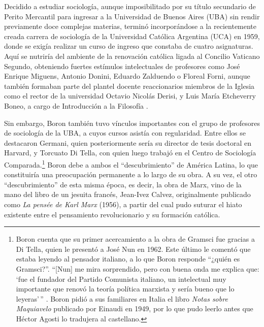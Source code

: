 Decidido a estudiar sociología, aunque imposibilitado por su título secundario de Perito Mercantil para ingresar a la Universidad de Buenos Aires (UBA) sin rendir previamente doce complejas materias, terminó incorporándose a la recientemente creada carrera de sociología de la Universidad Católica Argentina (UCA) en 1959, donde se exigía realizar un curso de ingreso que constaba de cuatro asignaturas. Aquí se nutriría del ambiente de la renovación católica ligada al Concilio Vaticano Segundo, obteniendo fuertes estímulos intelectuales de profesores como José Enrique Miguens, Antonio Donini, Eduardo Zalduendo o Floreal Forni, aunque también formaban parte del plantel docente reaccionarios miembros de la Iglesia como el rector de la universidad Octavio Nicolás Derisi, y Luis María Etcheverry Boneo, a cargo de Introducción a la Filosofía \parencite{281-ZANCA2006}.

Sin embargo, Boron también tuvo vínculos importantes con el grupo de profesores de sociología de la UBA, a cuyos cursos asistía con regularidad. Entre ellos se destacaron Germani, quien posteriormente sería su director de tesis doctoral en Harvard, y Torcuato Di Tella, con quien luego trabajó en el Centro de Sociología Comparada.\footnote{Boron cuenta que su primer acercamiento a la obra de Gramsci fue gracias a Di Tella, quien le presentó a José Nun en 1962. Este último le comentó que estaba leyendo al pensador italiano, a lo que Boron responde ``¿quién es Gramsci?''. ``[Nun] me mira sorprendido, pero con buena onda me explica que: `fue el fundador del Partido Comunista italiano, un intelectual muy importante que renovó la teoría política marxista y sería bueno que lo leyeras'\,'' \parencite[114]{1444-BORON2023}. Boron pidió a sus familiares en Italia el libro \emph{Notas sobre Maquiavelo} publicado por Einaudi en 1949, por lo que pudo leerlo antes que Héctor Agosti lo tradujera al castellano.} Boron debe a ambos el ``descubrimiento'' de América Latina, lo que constituiría una preocupación permanente a lo largo de su obra. A su vez, el otro ``descubrimiento'' de esta misma época, es decir, la obra de Marx, vino de la mano del libro de un jesuita francés, Jean-Ivez Calvez, originalmente publicado como \emph{La pensée de Karl Marx} (1956), a partir del cual pudo suturar el hiato existente entre el pensamiento revolucionario y su formación católica.


